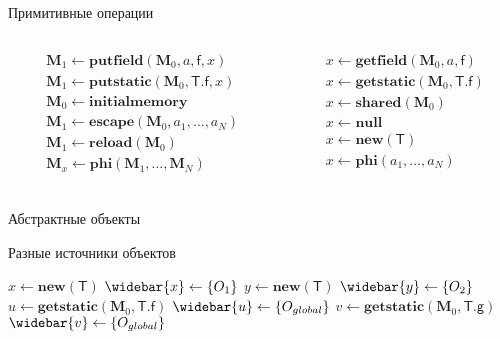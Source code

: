 \documentclass[usenames,dvipsnames,pdftex,unicode,hidelinks]{beamer}
\newcommand{\M}{\ensuremath{\mathbf{M}}}
\newcommand{\type}[1]{\mathsf{#1}}
\newcommand{\field}[1]{\mathsf{#1}}
\newcommand{\sfield}[2]{\type{#1}.\field{#2}}
\newcommand{\op}[1]{\mathbf{#1}}
\newcommand{\pts}[1]{\widebar{#1}}
\begin{document}
\begin{frame}{Примитивные операции}

  \begin{columns}[t]
    \begin{column}{0.5\textwidth}
      \begin{align*}
        &\M_1 \gets \op{putfield}(\M_0, a, \field{f}, x) \\
        &\M_1 \gets \op{putstatic}(\M_0, \sfield{T}{f}, x) \\
        &\M_0 \gets \op{initialmemory } \\
        &\M_1 \gets \op{escape}(\M_0, a_1, \ldots, a_N) \\
        &\M_1 \gets \op{reload}(\M_0) \\
        &\M_x \gets \op{phi}(\M_1, \ldots, \M_N) \\
      \end{align*}
    \end{column}
    \begin{column}{0.5\textwidth}
      \begin{align*}
        &x \gets \op{getfield}(\M_0, a, \field{f}) \\
        &x \gets \op{getstatic}(\M_0, \sfield{T}{f}) \\
        &x \gets \op{shared}(\M_0) \\
        &x \gets \op{null } \\
        &x \gets \op{new}(\type{T}) \\
        &x \gets \op{phi}(a_1, \ldots, a_N) \\
      \end{align*}
    \end{column}
  \end{columns}

\end{frame}

\begin{frame}{Абстрактные объекты}

  \begin{block}{Разные источники объектов}
    \begin{algorithmic}[1]
      \State $x \gets \op{new}(\type{T})$
        \Comment $\pts{x} \gets \{O_1\}$
      \State $y \gets \op{new}(\type{T})$
        \Comment $\pts{y} \gets \{O_2\}$
      \State $u \gets \op{getstatic}(\M_0, \sfield{T}{f})$
        \Comment $\pts{u} \gets \{O_{global}\}$
      \State $v \gets \op{getstatic}(\M_0, \sfield{T}{g})$
        \Comment $\pts{v} \gets \{O_{global}\}$
    \end{algorithmic}
  \end{block}

\end{frame}
\end{document}

